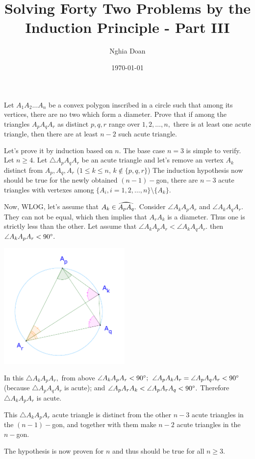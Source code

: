 \documentclass{article}
\title{Solving Forty Two Problems by the Induction Principle - Part III}
\author{Nghia Doan}
\date{\today}
\begin{document}
\maketitle

\begin{problem}
    Let $A_1A_2 \ldots A_n$ be a convex polygon inscribed in a circle such that among its vertices, there are no two which form a diameter.
    Prove that if among the triangles $A_p A_q A_r$ as distinct $p,q,r$ range over $1,2,\ldots,n,$ there is at least one acute triangle, then there are at least $n-2$ such acute triangle.
\end{problem}

\begin{soln}
    Let's prove it by induction based on $n$. The base case $n=3$ is simple to verify.
    Let $n \ge 4.$ Let $\triangle A_p A_q A_r$ be an acute triangle and let's remove an vertex $A_k$ distinct from $A_p, A_q, A_r$ ($1 \le k \le n$, $k \not \in \{p, q, r\}$)
    The induction hypothesis now should be true for the newly obtained $(n-1)-$gon,
    there are $n-3$ acute triangles with vertexes among $\{A_i, i=1,2,\ldots, n\} \setminus \{A_k\}$. 

    Now, WLOG, let's assume that $A_k \in \arc{A_pA_q}.$ Consider $\angle A_k A_p A_r$ and $\angle A_k A_q A_r.$
    They can not be equal, which then implies that $A_r A_k$ is a diameter. Thus one is strictly less than the other.
    Let assume that $\angle A_k A_p A_r < \angle A_k A_q A_r.$ then $\angle A_k A_p A_r < 90^\circ.$
    
    \begin{center}
        \includegraphics[width=6.5cm]{./svg/pdf/23-24-s5-o-p9.pdf}
    \end{center}

    In this $\triangle A_k A_p A_r,$ from above $\angle A_k A_p A_r < 90^\circ;$ 
    $\angle A_p A_k A_r = \angle A_p A_q A_r < 90^\circ$ (because $\triangle A_p A_q A_r$ is acute);
    and $\angle A_p A_r A_k < \angle A_p A_r A_q < 90^\circ.$ Therefore $\triangle A_k A_p A_r$ is acute.

    This $\triangle A_k A_p A_r$ acute triangle is distinct from the other $n-3$ acute triangles in the $(n-1)-$gon,
    and together with them make $n-2$ acute triangles in the $n-$gon.

    The hypothesis is now proven for $n$ and thus should be true for all $n\ge 3.$
\end{soln}
\end{document}
